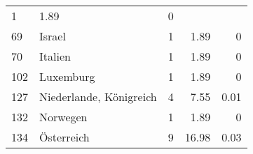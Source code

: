 \begin{longtable}{lXrrr}
       \num{1} &
       \num[round-mode=places,round-precision=2]{1.89} &
         \num[round-mode=places,round-precision=2]{0} \\

     69 &
     \multicolumn{1}{X}{ Israel   } &


       \num{1} &
       \num[round-mode=places,round-precision=2]{1.89} &
         \num[round-mode=places,round-precision=2]{0} \\

     70 &
     \multicolumn{1}{X}{ Italien   } &


       \num{1} &
       \num[round-mode=places,round-precision=2]{1.89} &
         \num[round-mode=places,round-precision=2]{0} \\

     102 &
     \multicolumn{1}{X}{ Luxemburg   } &


       \num{1} &
       \num[round-mode=places,round-precision=2]{1.89} &
         \num[round-mode=places,round-precision=2]{0} \\

     127 &
     \multicolumn{1}{X}{ Niederlande, Königreich   } &


       \num{4} &
       \num[round-mode=places,round-precision=2]{7.55} &
         \num[round-mode=places,round-precision=2]{0.01} \\

     132 &
     \multicolumn{1}{X}{ Norwegen   } &


       \num{1} &
       \num[round-mode=places,round-precision=2]{1.89} &
         \num[round-mode=places,round-precision=2]{0} \\

     134 &
     \multicolumn{1}{X}{ Österreich   } &


       \num{9} &
       \num[round-mode=places,round-precision=2]{16.98} &
         \num[round-mode=places,round-precision=2]{0.03} \\


\end{longtable}
